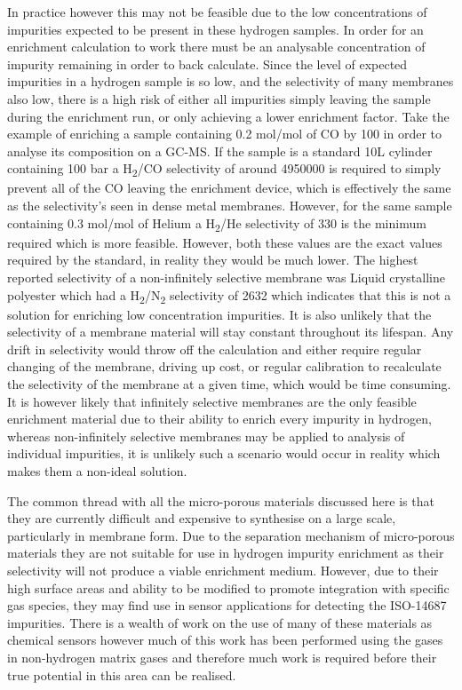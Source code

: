 In practice however this may not be feasible due to the low concentrations of impurities expected to be 
present in these hydrogen samples. In order for an enrichment calculation to work there must be an analysable 
concentration of impurity remaining in order to back calculate. Since the level of expected impurities in a 
hydrogen sample is so low, and the selectivity of many membranes also low, there is a high risk of either all 
impurities simply leaving the sample during the enrichment run, or only achieving a lower enrichment factor. 
Take the example of enriching a sample containing 0.2 \textmu mol/mol of CO by 100 in order to analyse its 
composition on 
a GC-MS. If the sample is a standard 10L cylinder containing 100 bar a H\textsubscript{2}/CO selectivity of 
around 4950000 is required to simply prevent all of the CO leaving the enrichment device, which is effectively the same as the selectivity’s seen in dense metal membranes. However, for the same sample containing 0.3 \textmu mol/mol 
of Helium a H\textsubscript{2}/He selectivity of 330 is the minimum required which is more feasible. However, both these values 
are the exact values required by the standard, in reality they would be much lower. The highest reported 
selectivity of a non-infinitely selective membrane was Liquid crystalline polyester which had a 
H\textsubscript{2}/N\textsubscript{2} 
selectivity of  2632 \cite{Weinkauf1992} which indicates that this is not a solution for enriching low concentration impurities. 
It is also unlikely that the selectivity of a membrane material will stay constant throughout its lifespan. 
Any drift in selectivity would throw off the calculation and either require regular changing of the membrane, 
driving up cost, or regular calibration to recalculate the selectivity of the membrane at a given time, which 
would be time consuming. It is however likely that infinitely selective membranes are the only feasible 
enrichment material due to their ability to enrich every impurity in hydrogen, whereas non-infinitely 
selective membranes may be applied to analysis of individual impurities, it is unlikely such a scenario 
would occur in reality which makes them a non-ideal solution. 

The common thread with all the micro-porous materials discussed here is that they are currently difficult and expensive to synthesise on a large scale, particularly in membrane form. Due to the separation mechanism of micro-porous materials they are not suitable for use in hydrogen impurity enrichment as their selectivity will not produce a viable enrichment medium. However, due to their high surface areas and ability to be modified to promote integration with specific gas species, they may find use in sensor applications for detecting the ISO-14687 impurities. There is a wealth of work on the use of many of these materials as chemical sensors however much of this work has been performed using the gases in non-hydrogen matrix gases and therefore much work is required before their true potential in this area can be realised. 

